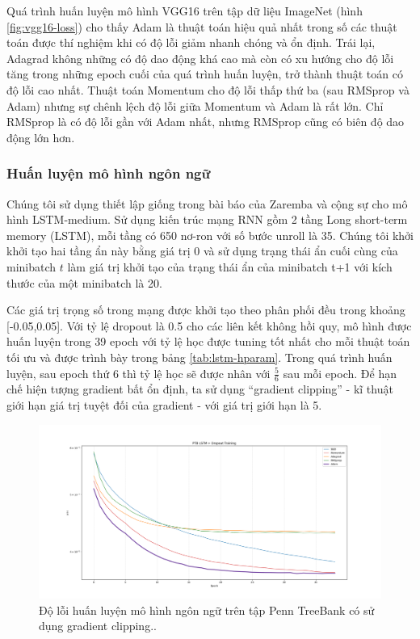 Quá trình huấn luyện mô hình VGG16 trên tập dữ liệu ImageNet (hình \ref{fig:vgg16-loss}) cho thấy Adam là thuật toán hiệu quả nhất trong số các thuật toán được thí nghiệm khi có độ lỗi giảm nhanh chóng và ổn định. Trái lại, Adagrad không những có độ dao động khá cao mà còn có xu hướng cho độ lỗi tăng trong những epoch cuối của quá trình huấn luyện, trở thành thuật toán có độ lỗi cao nhất. Thuật toán Momentum cho độ lỗi thấp thứ ba (sau RMSprop và Adam) nhưng sự chênh lệch độ lỗi giữa Momentum và Adam là rất lớn. Chỉ RMSprop là có độ lỗi gần với Adam nhất, nhưng RMSprop cũng có biên độ dao động lớn hơn.

\subsubsection{Huấn luyện mô hình ngôn ngữ}
\label{exp:lstm}

Chúng tôi sử dụng thiết lập giống trong bài báo của Zaremba và cộng sự \cite{zaremba2014recurrent} cho mô hình LSTM-medium. Sử dụng kiến trúc mạng RNN gồm 2 tầng Long short-term memory (LSTM), mỗi tầng có 650 nơ-ron với số bước unroll là 35. Chúng tôi khởi khởi tạo hai tầng ẩn này bằng giá trị 0 và sử dụng trạng thái ẩn cuối cùng của minibatch $t$ làm giá trị khởi tạo của trạng thái ẩn của minibatch t+1 với kích thước của một minibatch là 20.

Các giá trị trọng số trong mạng được khởi tạo theo phân phối đều trong khoảng [-0.05,0.05]. Với tỷ lệ dropout là 0.5 cho các liên kết không hồi quy, mô hình được huấn luyện trong 39 epoch với tỷ lệ học được tuning tốt nhất cho mỗi thuật toán tối ưu và được trình bày trong bảng \ref{tab:lstm-hparam}. Trong quá trình huấn luyện, sau epoch thứ 6 thì tỷ lệ học sẽ được nhân với $\frac{5}{6}$ sau mỗi epoch. Để hạn chế hiện tượng gradient bất ổn định, ta sử dụng ``gradient clipping'' - kĩ thuật giới hạn giá trị tuyệt đối của gradient - với giá trị giới hạn là 5.

\begin{figure}[htp]
	\centering
	\includegraphics[width=140 mm]{images/ptb.png}
	\caption{Độ lỗi huấn luyện mô hình ngôn ngữ trên tập Penn TreeBank có sử dụng gradient clipping..}
	\label{fig:ptb}
\end{figure}


